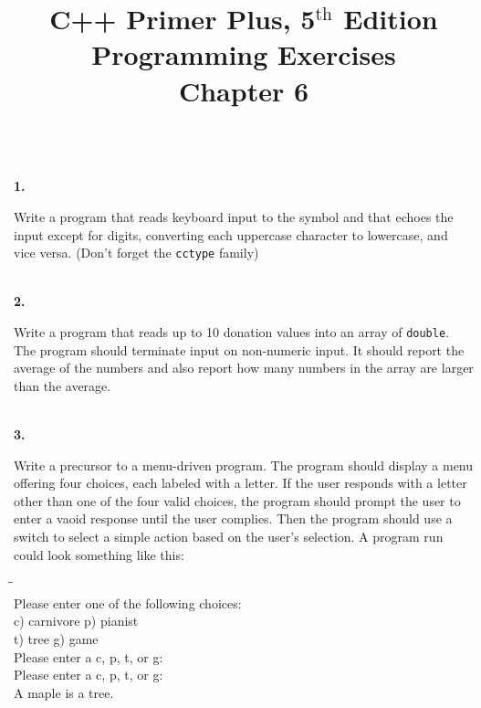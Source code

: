 \documentclass[10 pt]{amsart}
\newlength{\cwidth}
\newenvironment{cpart}[2][\cwidth]
	{\\ \phantom{\qquad}\textbf{#2. }\begin{minipage}[t]{#1}}
	{\end{minipage}}
\newcommand{\ttt}[1]{\texttt{#1}}
\newcommand{\ttb}[1]{\pmb{\texttt{#1}}}
\newcommand{\ChapNum}{6}
\begin{document}
	\title
	[Chapter \ChapNum]
	{C++ Primer Plus, 5$^\text{th}$ Edition \\
	Programming Exercises \\
	Chapter \ChapNum}

	\maketitle

	\begin{cpart}{1}
		Write a program that reads keyboard input to the \@ symbol
		and that echoes the input except for digits, converting each 
		uppercase character to lowercase, and vice versa.
		(Don't forget the \ttt{cctype} family)
	\end{cpart}
	\vspace{2ex}

	\begin{cpart}{2}
		Write a program that reads up to 10 donation values into an 
		array of \ttt{double}.
		The program should terminate input on non-numeric input.
		It should report the average of the numbers and also report how
		many numbers in the array are larger than the average.
	\end{cpart}
	\vspace{2ex}

	\begin{cpart}{3}
		Write a precursor to a menu-driven program.
		The program should display a menu offering four choices,
		each labeled with a letter.
		If the user responds with a letter other than one of the four
		valid choices, the program should prompt the user to enter
		a vaoid response until the user complies.
		Then the program should use a switch to select a simple
		action based on the user's selection.
		A program run could look something like this:
		{\ttfamily
			\begin{tabbing}
				\hspace{5 cm}\=\phantom{\qquad}\=\phantom{\qquad}\= \\
				Please enter one of the following choices:\\
				c) carnivore \> p) pianist \\
				t) tree 		\> g) game \\
				Please enter a c, p, t, or g:\ttb{ q} \\
				Please enter a c, p, t, or g:\ttb{ t} \\
				A maple is a tree.
			\end{tabbing}
		}
	\end{cpart}
	\newpage
\end{document}
